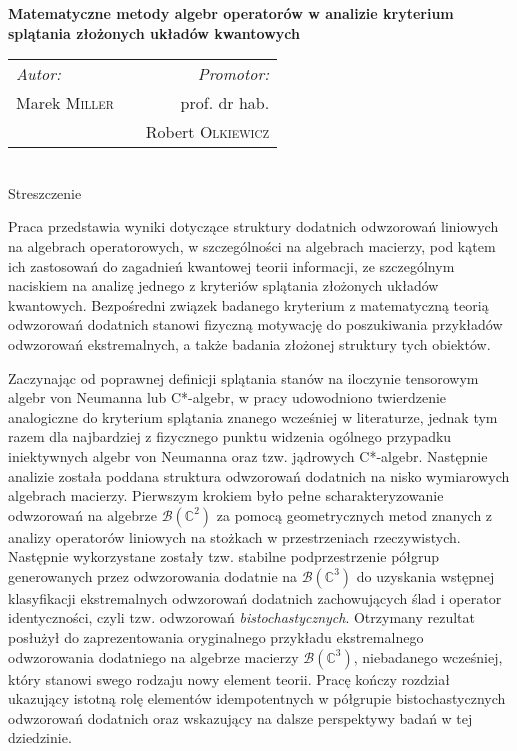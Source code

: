 \thispagestyle{empty}

\begin{center}
{ \large \bfseries
    Matematyczne metody algebr operatorów
    w analizie kryterium splątania
    złożonych układów kwantowych
}\\[1.5cm]

{
\begin{tabular}{lcr}
\emph{Autor:} & \hspace{3cm} & \emph{Promotor:}\\
Marek \textsc{Miller} & & prof. dr hab. \\
    & & Robert \textsc{Olkiewicz}
\end{tabular}
}
\\[1cm]
Streszczenie\\[0.5cm]
\end{center}

{
Praca przedstawia wyniki dotyczące struktury dodatnich odwzorowań liniowych
na algebrach operatorowych, w szczególności na algebrach macierzy,
pod kątem ich zastosowań do zagadnień kwantowej teorii informacji,
ze szczególnym naciskiem na analizę jednego z kryteriów splątania złożonych
układów kwantowych.
Bezpośredni związek badanego kryterium z matematyczną teorią odwzorowań dodatnich
stanowi fizyczną motywację do poszukiwania przykładów odwzorowań ekstremalnych,
a także badania złożonej struktury tych obiektów.

Zaczynając od poprawnej definicji splątania stanów na iloczynie tensorowym
algebr von Neumanna lub C*-algebr,
w pracy udowodniono twierdzenie analogiczne do kryterium splątania
znanego wcześniej w literaturze, jednak tym razem dla najbardziej
z fizycznego punktu widzenia ogólnego przypadku iniektywnych algebr
von Neumanna oraz tzw. jądrowych C*-algebr.
Następnie analizie została poddana struktura odwzorowań dodatnich na
nisko wymiarowych algebrach macierzy.
Pierwszym krokiem było pełne scharakteryzowanie odwzorowań na algebrze
$\mathcal{B}(\mathbb{C}^{2})$ za pomocą geometrycznych metod znanych z analizy
operatorów liniowych na stożkach w przestrzeniach rzeczywistych.
Następnie wykorzystane zostały tzw. stabilne podprzestrzenie półgrup
generowanych przez odwzorowania dodatnie na
$\mathcal{B}(\mathbb{C}^{3})$ do uzyskania
wstępnej klasyfikacji ekstremalnych odwzorowań dodatnich
zachowujących ślad i operator identyczności,
czyli tzw. odwzorowań \emph{bistochastycznych}.
Otrzymany rezultat posłużył do zaprezentowania oryginalnego przykładu
ekstremalnego odwzorowania dodatniego na algebrze macierzy
$\mathcal{B}(\mathbb{C}^{3})$, niebadanego wcześniej,
który stanowi swego rodzaju nowy element teorii.
Pracę kończy rozdział
ukazujący istotną rolę elementów idempotentnych w półgrupie bistochastycznych
odwzorowań dodatnich oraz wskazujący na dalsze perspektywy badań w tej dziedzinie.
}
\vfill
